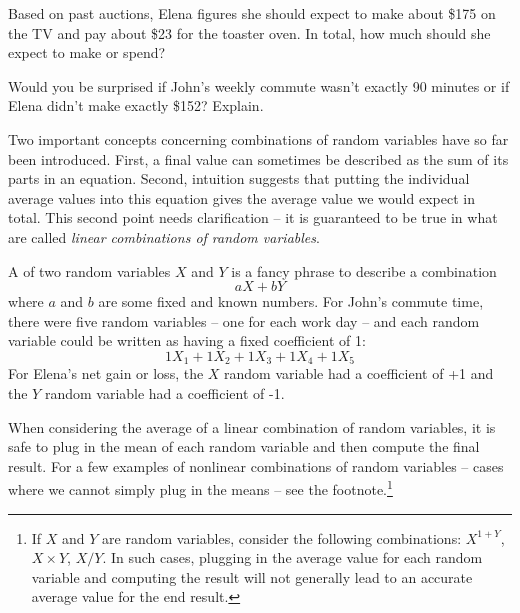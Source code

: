 \begin{exercisewrap}
\begin{nexercise}
Based on past auctions, Elena figures she should expect to make about \$175 on the TV and pay about \$23 for the toaster oven. In total, how much should she expect to make or spend?\footnotemark
\end{nexercise}
\end{exercisewrap}

\begin{exercisewrap}
\begin{nexercise} \label{explainWhyThereIsUncertaintyInTheSum}
Would you be surprised if John's weekly commute wasn't exactly 90 minutes or if Elena didn't make exactly \$152? Explain.\footnotemark
\end{nexercise}
\end{exercisewrap}

Two important concepts concerning combinations of random variables have so far been introduced. First, a final value can sometimes be described as the sum of its parts in an equation. Second, intuition suggests that putting the individual average values into this equation gives the average value we would expect in total. This second point needs clarification -- it is guaranteed to be true in what are called \emph{linear combinations of random variables}.

A  of two random variables $X$ and $Y$ is a fancy phrase to describe a combination
$$ aX + bY$$
where $a$ and $b$ are some fixed and known numbers. For John's commute time, there were five random variables -- one for each work day -- and each random variable could be written as having a fixed coefficient of 1:
$$ 1X_1 + 1 X_2 + 1 X_3 + 1 X_4 + 1 X_5 $$
For Elena's net gain or loss, the $X$ random variable had a coefficient of +1 and the $Y$ random variable had a coefficient of -1.

When considering the average of a linear combination of random variables, it is safe to plug in the mean of each random variable and then compute the final result. For a few examples of nonlinear combinations of random variables -- cases where we cannot simply plug in the means -- see the footnote.\footnote{If $X$ and $Y$ are random variables, consider the following combinations: $X^{1+Y}$, $X\times Y$, $X/Y$. In such cases, plugging in the average value for each random variable and computing the result will not generally lead to an accurate average value for the end result.}

